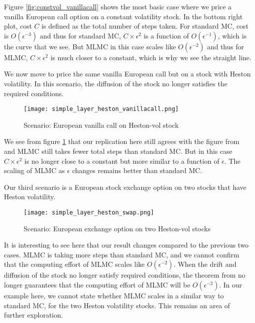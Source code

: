 \documentclass{article}
\begin{document}
    Figure \ref{fig:constvol_vanillacall} shows the most basic case where we price a vanilla European call option on a constant volatility stock. In the bottom right plot, cost $C$ is defined as the total number of steps taken. For standard MC, cost is $O(\epsilon^{-3})$ and thus for standard MC, $C \times \epsilon^{2}$ is a function of $O(\epsilon^{-1})$, which is the curve that we see. But MLMC in this case scales like $O(\epsilon^{-2})$ and thus for MLMC, $C \times \epsilon^{2}$ is much closer to a constant, which is why we see the straight line. 
    
    We now move to price the same vanilla European call but on a stock with Heston volatility. In this scenario, the diffusion of the stock no longer satisfies the required conditions. 
    \begin{figure}
        \texttt{[image: simple\_layer\_heston\_vanillacall.png]}
        \caption{Scenario: European vanilla call on Heston-vol stock}
        \label{fig:heston_vanillacall}
    \end{figure}
    
    We see from figure \ref{fig:heston_vanillacall} that our replication here still agrees with the figure from \cite{giles08} and MLMC still takes fewer total steps than standard MC. But in this case $C \times \epsilon^{2}$ is no longer close to a constant but more similar to a function of $\epsilon$. The scaling of MLMC as $\epsilon$ changes remains better than standard MC. 
    
    Our third scenario is a European stock exchange option on two stocks that have Heston volatility. 
    \begin{figure}
        \texttt{[image: simple\_layer\_heston\_swap.png]}
        \caption{Scenario: European exchange option on two Heston-vol stocks}
        \label{fig:heston_swap}
    \end{figure}
    
    It is interesting to see here that our result changes compared to the previous two cases. MLMC is taking more steps than standard MC, and we cannot confirm that the computing effort of MLMC scales like $O(\epsilon^{-2})$. When the drift and diffusion of the stock no longer satisfy required conditions, the theorem from \cite{giles08} no longer guarantees that the computing effort of MLMC will be $O(\epsilon^{-2})$. In our example here, we cannot state whether MLMC scales in a similar way to standard MC, for the two Heston volatility stocks. This remains an area of further exploration.
    


\end{document}
